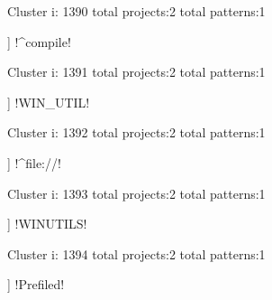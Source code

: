 Cluster i: 1390
total projects:2
total patterns:1
\begin{multicols}{1}
\begin{description}[noitemsep,topsep=0pt]
\item [[2] ] \cverb!^compile!
\end{description}
\end{multicols}







Cluster i: 1391
total projects:2
total patterns:1
\begin{multicols}{1}
\begin{description}[noitemsep,topsep=0pt]
\item [[2] ] \cverb!WIN_UTIL!
\end{description}
\end{multicols}







Cluster i: 1392
total projects:2
total patterns:1
\begin{multicols}{1}
\begin{description}[noitemsep,topsep=0pt]
\item [[2] ] \cverb!^file://!
\end{description}
\end{multicols}







Cluster i: 1393
total projects:2
total patterns:1
\begin{multicols}{1}
\begin{description}[noitemsep,topsep=0pt]
\item [[2] ] \cverb!WINUTILS!
\end{description}
\end{multicols}







Cluster i: 1394
total projects:2
total patterns:1
\begin{multicols}{1}
\begin{description}[noitemsep,topsep=0pt]
\item [[2] ] \cverb!Prefiled!
\end{description}
\end{multicols}







